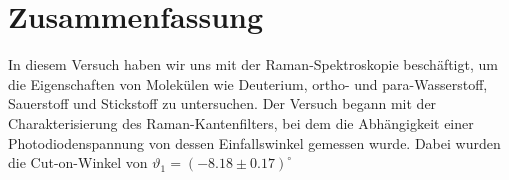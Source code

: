 \section{Zusammenfassung}
In diesem Versuch haben wir uns mit der Raman-Spektroskopie beschäftigt, um die Eigenschaften von Molekülen wie Deuterium, ortho- und para-Wasserstoff, Sauerstoff und Stickstoff zu untersuchen.
Der Versuch begann mit der Charakterisierung des Raman-Kantenfilters, bei dem die Abhängigkeit einer Photodiodenspannung von dessen Einfallswinkel gemessen wurde. Dabei wurden die Cut-on-Winkel von $\vartheta_1 = \left(-8.18\pm 0.17\right)^\circ$

